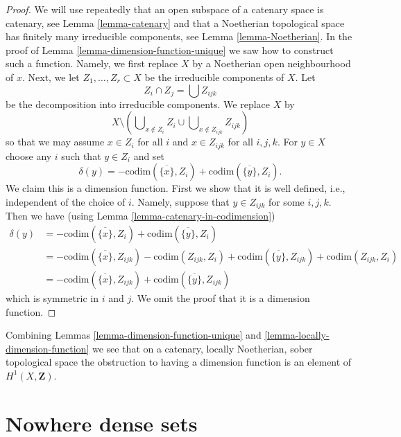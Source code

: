 \begin{proof}
We will use repeatedly
that an open subspace of a catenary space is catenary, see
Lemma \ref{lemma-catenary} and that a Noetherian topological space
has finitely many irreducible components, see Lemma \ref{lemma-Noetherian}.
In the proof of Lemma \ref{lemma-dimension-function-unique} we saw how to
construct such a function. Namely, we first replace $X$ by a Noetherian
open neighbourhood of $x$. Next, we let $Z_1, \ldots, Z_r \subset X$
be the irreducible components of $X$. Let
$$
Z_i \cap Z_j = \bigcup Z_{ijk}
$$
be the decomposition into irreducible components. We replace
$X$ by
$$
X \setminus \left(
\bigcup\nolimits_{x \not \in Z_i} Z_i
\cup
\bigcup\nolimits_{x \not \in Z_{ijk}} Z_{ijk}
\right)
$$
so that we may assume $x \in Z_i$ for all $i$ and
$x \in Z_{ijk}$ for all $i, j, k$. For $y \in X$ choose any
$i$ such that $y \in Z_i$ and set
$$
\delta(y) = - \text{codim}(\overline{\{x\}}, Z_i) 
+ \text{codim}(\overline{\{y\}}, Z_i).
$$
We claim this is a dimension function. First we show that it
is well defined, i.e., independent of the choice of $i$.
Namely, suppose that $y \in Z_{ijk}$ for some $i, j, k$.
Then we have (using Lemma \ref{lemma-catenary-in-codimension})
\begin{align*}
\delta(y) & =
- \text{codim}(\overline{\{x\}}, Z_i) 
+ \text{codim}(\overline{\{y\}}, Z_i) \\
& =
- \text{codim}(\overline{\{x\}}, Z_{ijk})
- \text{codim}(Z_{ijk}, Z_i)
+ \text{codim}(\overline{\{y\}}, Z_{ijk})
+ \text{codim}(Z_{ijk}, Z_i) \\
& =
- \text{codim}(\overline{\{x\}}, Z_{ijk})
+ \text{codim}(\overline{\{y\}}, Z_{ijk})
\end{align*}
which is symmetric in $i$ and $j$.
We omit the proof that it is a dimension function.
\end{proof}

\begin{remark}
\label{remark-obstruction-to-dimension-function}
Combining Lemmas \ref{lemma-dimension-function-unique} and
\ref{lemma-locally-dimension-function} we see that on a catenary,
locally Noetherian, sober topological space the obstruction to
having a dimension function is an element of
$H^1(X, \mathbf{Z})$.
\end{remark}



\section{Nowhere dense sets}
\label{section-nowhere-dense}


